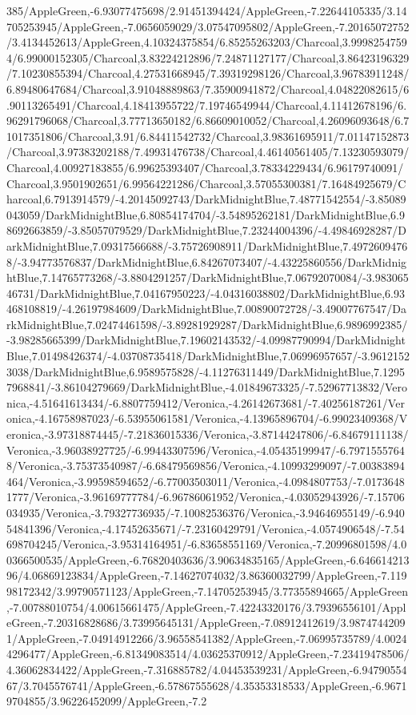 {\begin{tikzternal}
385/AppleGreen,-6.93077475698/2.91451394424/AppleGreen,-7.22644105335/3.14705253945/AppleGreen,-7.0656059029/3.07547095802/AppleGreen,-7.20165072752/3.4134452613/AppleGreen,4.10324375854/6.85255263203/Charcoal,3.99982547594/6.99000152305/Charcoal,3.83224212896/7.24871127177/Charcoal,3.86423196329/7.10230855394/Charcoal,4.27531668945/7.39319298126/Charcoal,3.96783911248/6.89480647684/Charcoal,3.91048889863/7.35900941872/Charcoal,4.04822082615/6.90113265491/Charcoal,4.18413955722/7.19746549944/Charcoal,4.11412678196/6.96291796068/Charcoal,3.77713650182/6.86609010052/Charcoal,4.26096093648/6.71017351806/Charcoal,3.91/6.84411542732/Charcoal,3.98361695911/7.01147152873/Charcoal,3.97383202188/7.49931476738/Charcoal,4.46140561405/7.13230593079/Charcoal,4.00927183855/6.99625393407/Charcoal,3.78334229434/6.96179740091/Charcoal,3.9501902651/6.99564221286/Charcoal,3.57055300381/7.16484925679/Charcoal,6.7913914579/-4.20145092743/DarkMidnightBlue,7.48771542554/-3.85089043059/DarkMidnightBlue,6.80854174704/-3.54895262181/DarkMidnightBlue,6.98692663859/-3.85057079529/DarkMidnightBlue,7.23244004396/-4.49846928287/DarkMidnightBlue,7.09317566688/-3.75726908911/DarkMidnightBlue,7.49726094768/-3.94773576837/DarkMidnightBlue,6.84267073407/-4.43225860556/DarkMidnightBlue,7.14765773268/-3.8804291257/DarkMidnightBlue,7.06792070084/-3.98306546731/DarkMidnightBlue,7.04167950223/-4.04316038802/DarkMidnightBlue,6.93468108819/-4.26197984609/DarkMidnightBlue,7.00890072728/-3.49007767547/DarkMidnightBlue,7.02474461598/-3.89281929287/DarkMidnightBlue,6.9896992385/-3.98285665399/DarkMidnightBlue,7.19602143532/-4.09987790994/DarkMidnightBlue,7.01498426374/-4.03708735418/DarkMidnightBlue,7.06996957657/-3.96121523038/DarkMidnightBlue,6.9589575828/-4.11276311449/DarkMidnightBlue,7.12957968841/-3.86104279669/DarkMidnightBlue,-4.01849673325/-7.52967713832/Veronica,-4.51641613434/-6.8807759412/Veronica,-4.26142673681/-7.40256187261/Veronica,-4.16758987023/-6.53955061581/Veronica,-4.13965896704/-6.99023409368/Veronica,-3.97318874445/-7.21836015336/Veronica,-3.87144247806/-6.84679111138/Veronica,-3.96038927725/-6.99443307596/Veronica,-4.05435199947/-6.79715557648/Veronica,-3.75373540987/-6.68479569856/Veronica,-4.10993299097/-7.00383894464/Veronica,-3.99598594652/-6.77003503011/Veronica,-4.0984807753/-7.01736481777/Veronica,-3.96169777784/-6.96786061952/Veronica,-4.03052943926/-7.15706034935/Veronica,-3.79327736935/-7.10082536376/Veronica,-3.94646955149/-6.94054841396/Veronica,-4.17452635671/-7.23160429791/Veronica,-4.0574906548/-7.54698704245/Veronica,-3.95314164951/-6.83658551169/Veronica,-7.20996801598/4.00366500535/AppleGreen,-6.76820403636/3.90634835165/AppleGreen,-6.64661421396/4.06869123834/AppleGreen,-7.14627074032/3.86360032799/AppleGreen,-7.11998172342/3.99790571123/AppleGreen,-7.14705253945/3.77355894665/AppleGreen,-7.00788010754/4.00615661475/AppleGreen,-7.42243320176/3.79396556101/AppleGreen,-7.20316828686/3.73995645131/AppleGreen,-7.08912412619/3.98747442091/AppleGreen,-7.04914912266/3.96558541382/AppleGreen,-7.06995735789/4.00244296477/AppleGreen,-6.81349083514/4.03625370912/AppleGreen,-7.23419478506/4.36062834422/AppleGreen,-7.316885782/4.04453539231/AppleGreen,-6.9479055467/3.7045576741/AppleGreen,-6.57867555628/4.35353318533/AppleGreen,-6.96719704855/3.96226452099/AppleGreen,-7.2
\end{tikzternal}}

